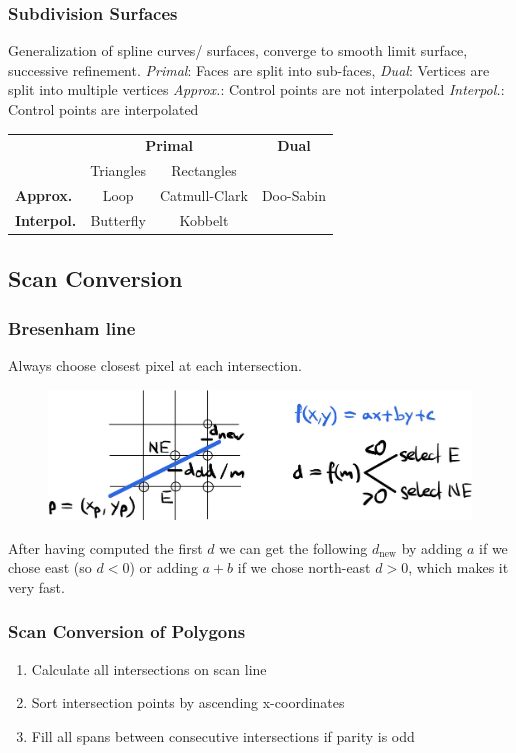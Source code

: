 \documentclass[a4paper,10pt]{article}
\renewcommand*{\arraystretch}{2}
\begin{document}
\subsubsection{Subdivision Surfaces} Generalization of spline curves/ surfaces, converge to smooth limit surface, successive refinement.
\textit{Primal}: Faces are split into sub-faces,
\textit{Dual}: Vertices are split into multiple vertices
\textit{Approx.}: Control points are not interpolated
\textit{Interpol.}: Control points are interpolated

\begin{center}
    \renewcommand{\arraystretch}{1.2}
\begin{tabularx}{\linewidth}{Xccc}
    \toprule
    & \multicolumn{2}{c}{\textbf{Primal}} & \textbf{Dual} \\
    & Triangles & Rectangles & \\
    \midrule
    \textbf{Approx.} & Loop & Catmull-Clark & Doo-Sabin \\
    \textbf{Interpol.} & Butterfly & Kobbelt & \\
    \bottomrule
\end{tabularx}
\end{center}

\subsection{Scan Conversion}
\subsubsection{Bresenham line} Always choose closest pixel at each intersection. 
\begin{figure}[h]
    \center
    \includegraphics[width=0.75\linewidth]{bresenham-line.jpeg}
\end{figure}

After having computed the first \( d \) we can get the following \( d_\text{new} \) by adding \( a \) if we chose east (so \( d < 0 \)) or adding \( a + b \) if we chose north-east \( d > 0 \), which makes it very fast.

\subsubsection{Scan Conversion of Polygons} 
\begin{enumerate}
    \item Calculate all intersections on scan line
    \item Sort intersection points by ascending x-coordinates
    \item Fill all spans between consecutive intersections if parity is odd
\end{enumerate}
\end{document}
